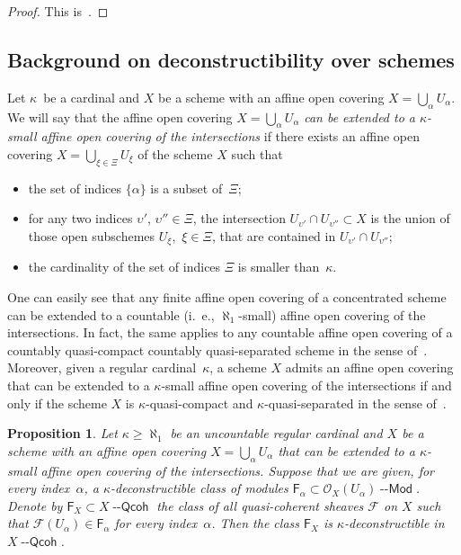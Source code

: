 \documentclass[12pt,a4paper]{amsart}
\newcommand{\+}{\protect\nobreakdash-}
\renewcommand{\:}{\colon}
\newcommand{\Modl}{{\operatorname{\mathsf{--Mod}}}}
\newcommand{\Qcoh}{{\operatorname{\mathsf{--Qcoh}}}}
\newcommand{\sF}{\mathsf F}
\newcommand{\cO}{\mathcal O}
\newcommand{\cF}{\mathcal F}
\theoremstyle{plain}
\newtheorem{prop}[thm]{Proposition}
\theoremstyle{definition}
\begin{document}
\begin{proof}
 This is~\cite[Proposition~4.4]{Sto0}. 
\end{proof}

\subsection{Background on deconstructibility over schemes}
 Let $\kappa$~be a cardinal and $X$ be a scheme with an affine open
covering $X=\bigcup_\alpha U_\alpha$.
 We will say that the affine open covering $X=\bigcup_\alpha U_\alpha$
\emph{can be extended to a $\kappa$\+small affine open covering of
the intersections} if there exists an affine open covering
$X=\bigcup_{\xi\in\Xi}U_\xi$ of the scheme $X$ such that
\begin{itemize}
\item the set of indices $\{\alpha\}$ is a subset of~$\Xi$;
\item for any two indices $\upsilon'$, $\upsilon''\in\Xi$,
the intersection $U_{\upsilon'}\cap U_{\upsilon''}\subset X$
is the union of those open subschemes $U_\xi$, \,$\xi\in\Xi$,
that are contained in $U_{\upsilon'}\cap U_{\upsilon''}$;
\item the cardinality of the set of indices $\Xi$ is smaller
than~$\kappa$.
\end{itemize}

 One can easily see that any finite affine open covering of
a concentrated scheme can be extended to a countable
(i.~e., $\aleph_1$\+small) affine open covering of the intersections.
 In fact, the same applies to any countable affine open covering of
a countably quasi-compact countably quasi-separated scheme
in the sense of~\cite[Section~4]{PS6}.
 Moreover, given a regular cardinal~$\kappa$, a scheme $X$ admits
an affine open covering that can be extended to a $\kappa$\+small
affine open covering of the intersections if and only if the scheme $X$
is $\kappa$\+quasi-compact and $\kappa$\+quasi-separated
in the sense of~\cite[Remark~4.6]{PS6}.

\begin{prop} \label{deconstructibility-for-qcoh-sheaves-prop}
 Let\/ $\kappa\ge\aleph_1$ be an uncountable regular cardinal and $X$
be a scheme with an affine open covering $X=\bigcup_\alpha U_\alpha$
that can be extended to a\/ $\kappa$\+small affine open covering of
the intersections.
 Suppose that we are given, for every index\/~$\alpha$,
a\/ $\kappa$\+deconstructible class of modules\/ $\sF_\alpha\subset
\cO_X(U_\alpha)\Modl$.
 Denote by\/ $\sF_X\subset X\Qcoh$ the class of all quasi-coherent
sheaves\/ $\cF$ on $X$ such that\/ $\cF(U_\alpha)\in\sF_\alpha$
for every index\/~$\alpha$.
 Then the class\/ $\sF_X$ is\/ $\kappa$\+deconstructible in\/ $X\Qcoh$.
\end{prop}
\end{document}
